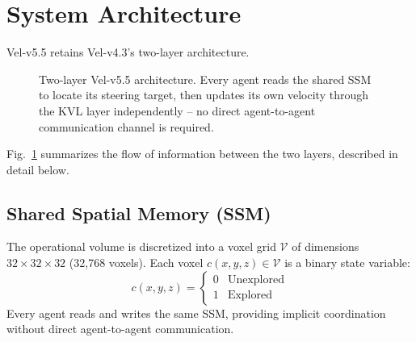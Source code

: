 \documentclass[10pt,journal]{IEEEtran}
\begin{document}
\section{System Architecture}
\label{sec:architecture}

Vel-v5.5 retains Vel-v4.3's two-layer architecture.

\begin{figure}[t]
\centering
{}
\caption{Two-layer Vel-v5.5 architecture. Every agent reads the shared SSM
to locate its steering target, then updates its own velocity through the
KVL layer independently -- no direct agent-to-agent communication channel
is required.}
\label{fig:architecture}
\end{figure}

Fig.~\ref{fig:architecture} summarizes the flow of information between the
two layers, described in detail below.

\subsection{Shared Spatial Memory (SSM)}
The operational volume is discretized into a voxel grid $\mathcal{V}$ of
dimensions $32\times32\times32$ (32{,}768 voxels). Each voxel
$c(x,y,z)\in\mathcal{V}$ is a binary state variable:
\begin{equation}
c(x,y,z) = \begin{cases} 0 & \text{Unexplored} \\ 1 & \text{Explored} \end{cases}
\end{equation}
Every agent reads and writes the same SSM, providing implicit coordination
without direct agent-to-agent communication.
\end{document}
